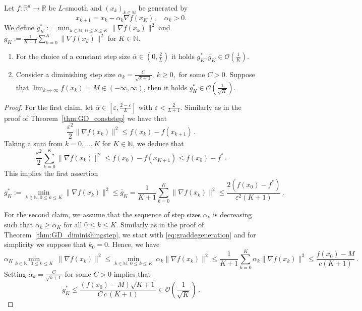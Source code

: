 \documentclass[12pt,openany]{book}
\theoremstyle{definition}
\theoremstyle{definition}
\newcommand{\cO}{\mathcal{O}}
\newcommand{\N}{\mathbb{N}}
\newcommand{\R}{\mathbb{R}}
\begin{document}
\begin{cor}\label{cor:gradient_convergence}
Let $f:\R^d\to\R$ be $L$-smooth and $(x_k)_{k\in\N}$ be generated by
\[x_{k+1} = x_k - \alpha_k \nabla f(x_K),\quad \alpha_k>0.\]
We define $g_K^\ast := \min_{k\in\N,\ 0\le k \le K} \|\nabla f(x_k)\|^2$ and $\bar g_K := \frac{1}{K+1}\sum_{k=0}^K\|\nabla f(x_k)\|^2$ for $K\in\N$.
\begin{enumerate}
\item[(i)] For the choice of a constant step size $\bar\alpha \in(0,\frac{2}L)$ it holds $g_K^\ast,\bar g_K \in \mathcal O(\frac{1}{K})$.
\item[(ii)] Consider a diminishing step size $\alpha_k = \frac{C}{\sqrt{k+1}},\ k\ge0,$ for some $C>0$. Suppose that $\lim_{k\to\infty} f(x_k) = M \in(-\infty,\infty)$, then it holds $g_K^\ast \in \mathcal O(\frac{1}{\sqrt{K}})$.
\end{enumerate}
\end{cor}
\begin{proof}
    For the first claim, let $\bar\alpha \in[\varepsilon,\frac{2-\varepsilon}L]$ with $\varepsilon<\frac{2}{L+1}$. Similarly as in the proof of Theorem~\ref{thm:GD_conststep} we have that
    \[ \frac{\varepsilon^2}{2}\|\nabla f(x_k)\|^2 \le f(x_{k})-f(x_{k+1})\,.\]
    Taking a sum from $k=0,\dots, K$ for $K\in\N$, we deduce that
    \[ \frac{\varepsilon^2}{2}\sum_{k=0}^K \|\nabla f(x_k)\|^2 \le f(x_0)-f(x_{K+1})\le f(x_0)-f^\ast\,.\]
    This implies the first assertion
    \[g_K^\ast := \min_{k\in\N, 0\le k \le K} \|\nabla f(x_k)\|^2 \le \bar g_K = \frac1{K+1} \sum_{k=0}^{K} \|\nabla f(x_k)\|^2 \le \frac{2(f(x_0)-f^\ast)}{\varepsilon^2(K+1)}\,.\]

    For the second claim, we assume that the sequence of step sizes $\alpha_k$ is decreasing such that $\alpha_k\ge \alpha_K$ for all $0\le k\le K$. Similarly as in the proof of Theorem~\ref{thm:GD_diminishingstep}, we start with \eqref{eq:graddegeneration} and for simplicity we suppose that $k_0 = 0$. Hence, we have
    \[\alpha_K \min_{k\in\N,\ 0\le k\le K}\ \|\nabla f(x_k)\|^2 \le \min_{k\in\N,\ 0\le k\le K}\ \alpha_k\|\nabla f(x_k)\|^2 \le \frac{1}{K+1}\sum_{k=0}^K \alpha_k\|\nabla f(x_k)\|^2 \le \frac{f(x_0)-M}{c(K+1)}\,.\]
    Setting $\alpha_k = \frac{C}{\sqrt{k+1}}$ for some $C>0$ implies that
    \[g_K^\ast \le \frac{(f(x_0)-M)\sqrt{K+1}}{C\,c\,(K+1)}\in\cO(\frac{1}{\sqrt{K}})\,.\]
\end{proof}
\end{document}
